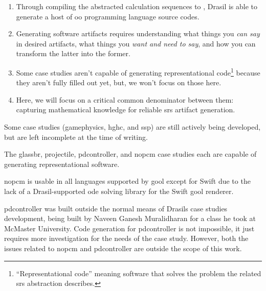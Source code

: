 \begin{enumerate}
      \item Through compiling the abstracted calculation sequences to 
            \cite{Carette2019}, Drasil is able to generate a host of \acs{oo}
            programming language source codes.

      \item Generating software artifacts requires understanding what things you
            \textit{can say} in desired artifacts, what things you \textit{want
                  and need to say}, and how you can transform the latter into the
            former.

      \item Some case studies aren't capable of generating representational
            code\footnote{``Representational code'' meaning software that solves
                  the problem the related \acs{srs} abstraction describes.} because
            they aren't fully filled out yet, but, we won't focus on those here.

      \item Here, we will focus on a critical common denominator between them:
            capturing mathematical knowledge for reliable \acs{srs} artifact
            generation.

\end{enumerate}

\caseStudiesCodeTable{}






Some case studies (\acs{gamephysics}, \acs{hghc}, and \acs{ssp}) are still
actively being developed, but are left incomplete at the time of writing.

The \acs{glassbr}, \acs{projectile}, \acs{pdcontroller}, and \acs{nopcm} case
studies each are capable of generating representational software.

\acs{nopcm} is usable in all languages supported by \acs{gool} except for Swift
due to the lack of a Drasil-supported \acs{ode} solving library for the Swift
\acs{gool} renderer.

\acs{pdcontroller} was built outside the normal means of Drasils case studies
development, being built by Naveen Ganesh Muralidharan \cite{DrasilPR2289Naveen}
for a class he took at McMaster University. Code generation for
\acs{pdcontroller} is not impossible, it just requires more investigation for
the needs of the case study. However, both the issues related to \acs{nopcm} and
\acs{pdcontroller} are outside the scope of this work.
